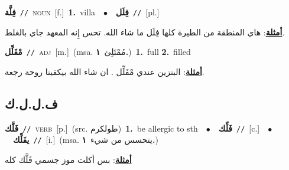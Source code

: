 \documentclass[10pt,a4paper,twoside]{article} %
\begin{document}
\begin{multicols}{2}
{\setlength\topsep{0pt}\textbf{\foreignlanguage{arabic}{فِلَّة}}\ {\color{gray}\texttt{//}\color{black}}\ \textsc{noun}\ [f.]\ \textbf{1.}~villa\ \ $\bullet$\ \ \setlength\topsep{0pt}\textbf{\foreignlanguage{arabic}{فِلَل}}\ {\color{gray}\texttt{//}\color{black}}\ [pl.]\  \begin{flushright}\color{gray}\foreignlanguage{arabic}{\textbf{\underline{\foreignlanguage{arabic}{أمثلة}}}: هاي المنطقة من الطيرة كلها فِلَل ما شاء الله. تحس إِنه المعهد جاي بالغلط.}\end{flushright}\color{black}} \vspace{2mm}

{\setlength\topsep{0pt}\textbf{\foreignlanguage{arabic}{مْفَلِّل}}\ {\color{gray}\texttt{//}\color{black}}\ \textsc{adj}\ [m.]\ \color{gray}(msa. \foreignlanguage{arabic}{مُمْتَلِئ}~\foreignlanguage{arabic}{\textbf{١.}})\color{black}\ \textbf{1.}~full  \textbf{2.}~filled\  \begin{flushright}\color{gray}\foreignlanguage{arabic}{\textbf{\underline{\foreignlanguage{arabic}{أمثلة}}}: البنزين عندي مْفَلِّل . ان شاء الله بيكفينا روحة رجعة.}\end{flushright}\color{black}} \vspace{2mm}

\vspace{-3mm}
\subsection*{\color{blue}\foreignlanguage{arabic}{ف.ل.ل.ك}\color{blue}{}} 

{\setlength\topsep{0pt}\textbf{\foreignlanguage{arabic}{فَلَّك}}\ {\color{gray}\texttt{//}\color{black}}\ \textsc{verb}\ [p.]\ (src. \color{gray}\foreignlanguage{arabic}{طولكرم}\color{black})\ \textbf{1.}~be allergic to sth\ \ $\bullet$\ \ \setlength\topsep{0pt}\textbf{\foreignlanguage{arabic}{فَلِّك}}\ {\color{gray}\texttt{//}\color{black}}\ [c.]\ \ $\bullet$\ \ \setlength\topsep{0pt}\textbf{\foreignlanguage{arabic}{يفَلِّك}}\ {\color{gray}\texttt{//}\color{black}}\ [i.]\ \color{gray}(msa. \foreignlanguage{arabic}{يتحسس من شيء}~\foreignlanguage{arabic}{\textbf{١.}})\color{black}\  \begin{flushright}\color{gray}\foreignlanguage{arabic}{\textbf{\underline{\foreignlanguage{arabic}{أمثلة}}}: بس أكلت موز جسمي فَلَّك كله}\end{flushright}\color{black}} \vspace{2mm}


\end{multicols}
\end{document}
